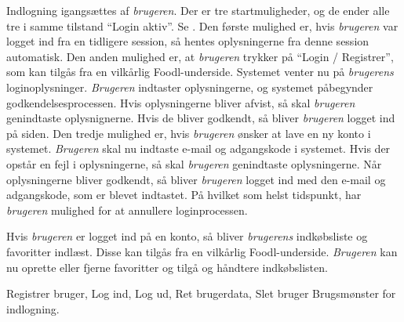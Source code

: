 {Indlogning igangsættes af \textit{brugeren}. Der er tre startmuligheder, og de ender alle tre i samme tilstand “Login aktiv”. Se . Den første mulighed er, hvis \textit{brugeren} var logget ind fra en tidligere session, så hentes oplysningerne fra denne session automatisk. Den anden mulighed er, at \textit{brugeren} trykker på “Login / Registrer”, som kan tilgås fra en vilkårlig Foodl-underside. Systemet venter nu på \textit{brugerens} loginoplysninger. \textit{Brugeren} indtaster oplysningerne, og systemet påbegynder godkendelsesprocessen. Hvis oplysningerne bliver afvist, så skal \textit{brugeren} genindtaste oplysnignerne. Hvis de bliver godkendt, så bliver \textit{brugeren} logget ind på siden. Den tredje mulighed er, hvis \textit{brugeren} ønsker at lave en ny konto i systemet. \textit{Brugeren} skal nu indtaste e-mail og adgangskode i systemet. Hvis der opstår en fejl i oplysningerne, så skal \textit{brugeren} genindtaste oplysningerne. Når oplysningerne bliver godkendt, så bliver \textit{brugeren} logget ind med den e-mail og adgangskode, som er blevet indtastet. På hvilket som helst tidspunkt, har \textit{brugeren} mulighed for at annullere loginprocessen.

Hvis \textit{brugeren} er logget ind på en konto, så bliver \textit{brugerens} indkøbsliste og favoritter indlæst. Disse kan tilgås fra en vilkårlig Foodl-underside. \textit{Brugeren} kan nu oprette eller fjerne favoritter og tilgå og håndtere indkøbslisten.}
{}
{Registrer bruger, Log ind, Log ud, Ret brugerdata, Slet bruger}
{Brugsmønster for indlogning.}